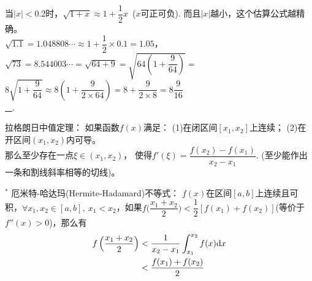 \begin{multicols}{2}
\begin{enumerate}[leftmargin=20pt]
{\item 当$ |x| < 0.2 $时，$ \sqrt{1+x}\approx 1+\dfrac{1}{2}x $\ ($ x $可正可负).
而且$ |x| $越小，这个估算公式越精确。\\
$ \sqrt{1.1}=1.048808\cdots \approx 1+\dfrac{1}{2}\times 0.1=1.05 $，\\
$ \sqrt{73}=8.544003\cdots=\sqrt{64+9}=\sqrt{64\left(1+\dfrac{9}{64}\right)}=$\\ 
\ifte \underline{ {\footnotesize $ 8\sqrt{1+\dfrac{9}{64}}\approx 8\left(1+
\dfrac{9}{2\times 64}\right)=8+\dfrac{9}{2\times 8}=8\dfrac{9}{16} $} }
\else\\ \underline{\ \hspace{6cm} }\fi .

\item 拉格朗日中值定理： 如果函数$ f(x) $满足：
(1)在闭区间$ [x_1,x_2] $上连续；
(2)在开区间$ (x_1,x_2) $内可导。\\
那么至少存在一点$ \xi\in(x_1,x_2) $，
使得$ f'(\xi)=\dfrac{f(x_2)-f(x_1)}{x_2-x_1} $.
(至少能作出一条和割线斜率相等的切线)。 

\item $^*$ 厄米特-哈达玛(Hermite-Hadamard)不等式：
$ f(x) $在区间$ [a,b] $上连续且可积，$ \forall x_1,x_2\in [a,b],\ 
x_1<x_2 $，如果$ f\Big(\dfrac{x_1+x_2}{2}\Big)<
\dfrac{1}{2}[f(x_1)+f(x_2)] $(等价于$ f''(x)>0 $)，那么有 
\begin{align*}
    f\left(\dfrac{x_1+x_2}{2}\right) &<\dfrac{1}{x_2-x_1}
    \int_{x_1}^{x_2}f(x)\mathrm{d} x \\ 
    &< \dfrac{f(x_1)+f(x_2)}{2}
\end{align*}

}
\end{enumerate}
\end{multicols}
